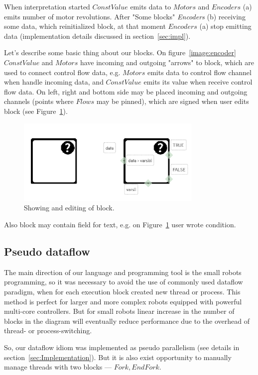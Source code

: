 \documentclass[conference,compsoc]{IEEEtran}
\begin{document}
When interpretation started $ConstValue$ emits data to $Motors$ and $Encoders$ (a) emits number of motor revolutions. After "Some blocks" \textit{Encoders} (b) receiving some data, which reinitialized block, at that moment $Encoders$ (a) stop emitting data (implementation details discussed in section~\ref{sec:impl}).

Let's describe some basic thing about our blocks. On figure~\ref{image:encoder} $ConstValue$ and $Motors$ have incoming and outgoing "arrows" to block, which are used to connect control flow data, e.g. $Motors$ emits data to control flow channel when handle incoming data, and $ConstValue$ emits its value when receive control flow data. On left, right and bottom side may be placed incoming and outgoing channels (points where $Flows$ may be pinned), which are signed when user edits block (see Figure~\ref{image:block}).
\begin{figure}[ht]
	\centering
	\includegraphics[width=3.5in]{block.png}
	\caption{Showing and editing of block.}
	\label{image:block}
\end{figure}
Also block may contain field for text, e.g. on Figure~\ref{image:block} user wrote condition.



\subsection{Pseudo dataflow}
The main direction of our language and programming tool is the small robots programming, so it was necessary to avoid the use of commonly used dataflow paradigm, when for each execution block created new thread or process. This method is perfect for larger and more complex robots equipped with powerful multi-core controllers. But for small robots linear increase in the number of blocks in the diagram will eventually reduce performance due to the overhead of thread- or process-switching.

So, our dataflow idiom was implemented as pseudo parallelism (see details in section~\ref{sec:Implementation}). But it is also exist opportunity to manually manage threads with two blocks --- $Fork, EndFork$.
\end{document}
